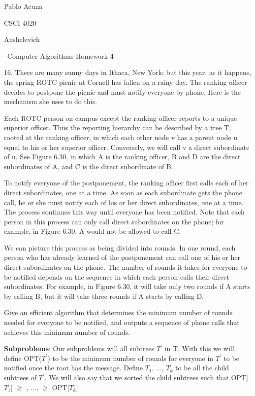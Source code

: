 \documentclass{article}
\begin{document}
Pablo Acuna

CSCI 4020

Anshelevich

{\centering\ Computer Algorithms Homework 4 \par}

16. There are many sunny days in Ithaca, New York; but this year, as it
happens, the spring ROTC picnic at Cornell has fallen on a rainy day.
The ranking officer decides to postpone the picnic and must notify everyone
by phone. Here is the mechanism she uses to do this.

Each ROTC person on campus except the ranking officer reports to a
unique superior officer. Thus the reporting hierarchy can be described by
a tree T, rooted at the ranking officer, in which each other node v has a
parent node u equal to his or her superior officer. Conversely, we will
call v a direct subordinate of u. See Figure 6.30, in which A is the
ranking officer, B and D are the direct subordinates of A, and C is the
direct subordinate of B.

To notify everyone of the postponement, the ranking officer first calls
each of her direct subordinates, one at a time. As soon as each subordinate
gets the phone call, he or she must notify each of his or her direct
subordinates, one at a time. The process continues this way until everyone
has been notified. Note that each person in this process can only call
direct subordinates on the phone; for example, in Figure 6.30, A would not
be allowed to call C.

We can picture this process as being divided into rounds. In one round,
each person who has already learned of the postponement can call one of his
or her direct subordinates on the phone. The number of rounds it takes for
everyone to be notified depends on the sequence in which each person calls
their direct subordinates. For example, in Figure 6.30, it will take only
two rounds if A starts by calling B, but it will take three rounds if A
starts by calling D.

Give an efficient algorithm that determines the minimum number of
rounds needed for everyone to be notified, and outputs a sequence of
phone calls that achieves this minimum number of rounds. \newline

\textbf{Subproblems}: Our subproblems will all subtrees $T^{'}$ in T. With
this we will define OPT($T^{'}$) to be the minimum number of rounds
for everyone in $T^{'}$ to be notified once the root has the message.
Define $T_{1}$, ..., $T_{k}$ to be all the child subtrees of $T^{'}$. We will also
say that we sorted the child subtrees such that OPT[$T_{1}$] $\geq$ , ...,
$\geq$ OPT[$T_{k}$] \newline
\end{document}
